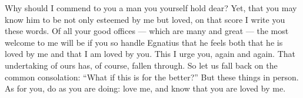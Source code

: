 

 Why should I commend to you a man you yourself hold dear? Yet, that you may know him to be not only esteemed by me but loved, on that score I write you these words. Of all your good offices --- which are many and great --- the most welcome to me will be if you so handle Egnatius that he feels both that he is loved by me and that I am loved by you. This I urge you, again and again. That undertaking of ours has, of course, fallen through. So let us fall back on the common consolation: ``What if this is for the better?'' But these things in person. As for you, do as you are doing: love me, and know that you are loved by me.
